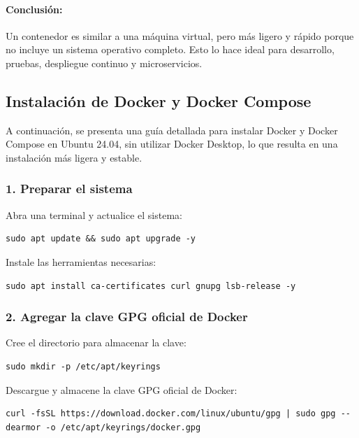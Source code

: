 \paragraph{Conclusión:}
Un contenedor es similar a una máquina virtual, pero más ligero y rápido porque no incluye un sistema operativo completo. Esto lo hace ideal para desarrollo, pruebas, despliegue continuo y microservicios.

\subsection{Instalación de Docker y Docker Compose}

A continuación, se presenta una guía detallada para instalar Docker y Docker Compose en Ubuntu 24.04, sin utilizar Docker Desktop, lo que resulta en una instalación más ligera y estable.

\subsubsection{1. Preparar el sistema}

Abra una terminal y actualice el sistema:

\begin{lstlisting}[style=customstyle]
sudo apt update && sudo apt upgrade -y
\end{lstlisting}

Instale las herramientas necesarias:

\begin{lstlisting}[style=customstyle]
sudo apt install ca-certificates curl gnupg lsb-release -y
\end{lstlisting}

\subsubsection{2. Agregar la clave GPG oficial de Docker}

Cree el directorio para almacenar la clave:

\begin{lstlisting}[style=customstyle]
sudo mkdir -p /etc/apt/keyrings
\end{lstlisting}

Descargue y almacene la clave GPG oficial de Docker:

\begin{lstlisting}[style=customstyle]
curl -fsSL https://download.docker.com/linux/ubuntu/gpg | sudo gpg --dearmor -o /etc/apt/keyrings/docker.gpg
\end{lstlisting}

